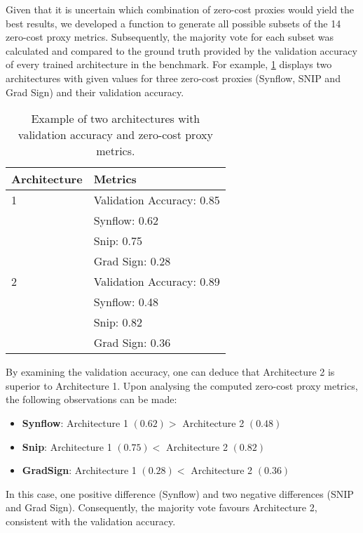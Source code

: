Given that it is uncertain which combination of zero-cost proxies would yield the best results, we developed a function to generate all possible subsets of the 14 zero-cost proxy metrics. Subsequently, the majority vote for each subset was calculated and compared to the ground truth provided by the validation accuracy of every trained architecture in the benchmark. For example, \cref{tab:example_architectures} displays two architectures with given values for three zero-cost proxies (\gls{Synflow}, \gls{SNIP} and Grad Sign) and their validation accuracy. 
\clearpage

\begin{table}[ht]
\centering
\caption{Example of two architectures with validation accuracy and zero-cost proxy metrics.}
\begin{tabular}{ll}
\textbf{Architecture} & \textbf{Metrics}          \\ \hline
\multicolumn{1}{l|}{1} & \multicolumn{1}{l}{Validation Accuracy: 0.85} \\
\multicolumn{1}{l|}{\cellcolor{verylightgray}} & \cellcolor{verylightgray}Synflow: 0.62 \\
\multicolumn{1}{l|}{} & \multicolumn{1}{l}{Snip: 0.75} \\
\multicolumn{1}{l|}{\cellcolor{verylightgray}} & \cellcolor{verylightgray}Grad Sign: 0.28 \\ \hline
\multicolumn{1}{l|}{2} & \multicolumn{1}{l}{Validation Accuracy: 0.89} \\
\multicolumn{1}{l|}{\cellcolor{verylightgray}} & \cellcolor{verylightgray}Synflow: 0.48 \\
\multicolumn{1}{l|}{} & \multicolumn{1}{l}{Snip: 0.82} \\
\multicolumn{1}{l|}{\cellcolor{verylightgray}} & \cellcolor{verylightgray}Grad Sign: 0.36
\end{tabular}
\label{tab:example_architectures}
\end{table}

By examining the validation accuracy, one can deduce that Architecture 2 is superior to Architecture 1. Upon analysing the computed zero-cost proxy metrics, the following observations can be made:

\begin{itemize}
\item \textbf{Synflow}: Architecture 1 $(0.62) >$ Architecture 2 $(0.48)$
\item \textbf{Snip}: Architecture 1 $(0.75) <$ Architecture 2 $(0.82)$
\item \textbf{GradSign}: Architecture 1 $(0.28) <$ Architecture 2 $(0.36)$
\end{itemize}

In this case, one positive difference (\gls{Synflow}) and two negative differences (\gls{SNIP} and Grad Sign). Consequently, the majority vote favours Architecture 2, consistent with the validation accuracy.